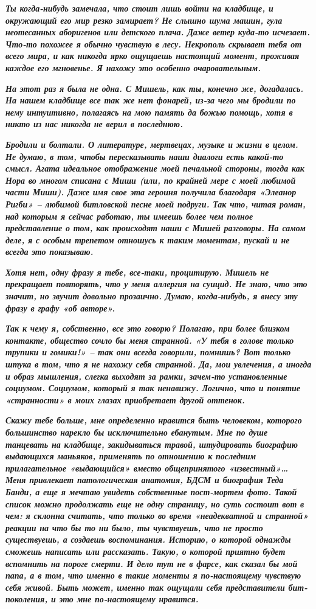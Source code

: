 \documentclass[
]{book}
\begin{document}
\textbf{\emph{
Ты когда-нибудь замечала, что стоит лишь войти на кладбище, и окружающий его мир резко замирает? Не слышно шума машин, гула неотесанных аборигенов или детского плача. Даже ветер куда-то исчезает. Что-то похожее я обычно чувствую в лесу. Некрополь скрывает тебя от всего мира, и как никогда ярко ощущаешь настоящий момент, проживая каждое его мгновенье. Я нахожу это особенно очаровательным.
}}

\textbf{\emph{
На этот раз я была не одна. С Мишель, как ты, конечно же, догадалась. На нашем кладбище все так же нет фонарей, из-за чего мы бродили по нему интуитивно, полагаясь на мою память да божью помощь, хотя в никто из нас никогда не верил в последнюю.
}}

\textbf{\emph{
Бродили и болтали. О литературе, мертвецах, музыке и жизни в целом. Не думаю, в том, чтобы пересказывать наши диалоги есть какой-то смысл. Агата идеальное отображение моей печальной стороны, тогда как Нора во многом списана с Миши (или, по крайней мере с моей любимой части Миши). Даже имя свое эта героиня получила благодаря «Элеанор Ригби» -- любимой битловской песне моей подруги. Так что, читая роман, над которым я сейчас работаю, ты имеешь более чем полное представление о том, как происходят наши с Мишей разговоры. На самом деле, я с особым трепетом отношусь к таким моментам, пускай и не всегда это показываю.
}}

\textbf{\emph{
Хотя нет, одну фразу я тебе, все-таки, процитирую. Мишель не прекращает повторять, что у меня аллергия на суицид. Не знаю, что это значит, но звучит довольно прозаично. Думаю, когда-нибудь, я внесу эту фразу в графу «об авторе».
}}

\textbf{\emph{
Так к чему я, собственно, все это говорю? Полагаю, при более близком контакте, общество сочло бы меня странной. «У тебя в голове только трупики и гомики!» -- так они всегда говорили, помнишь? Вот только штука в том, что я не нахожу себя странной. Да, мои увлечения, а иногда и образ мышления, слегка выходят за рамки, зачем-то установленные социумом. Социумом, который я так ненавижу. Логично, что и понятие «странности» в моих глазах приобретает другой оттенок.
}}

\textbf{\emph{
Скажу тебе больше, мне определенно нравится быть человеком, которого большинство нарекло бы исключительно ебанутым. Мне по душе танцевать на кладбище, закидываться травой, штудировать биографию выдающихся маньяков, применять по отношению к последним прилагательное «выдающийся» вместо общепринятого «известный»\ldots{} Меня привлекает патологическая анатомия, БДСМ и биография Теда Банди, а еще я мечтаю увидеть собственные пост-мортем фото. Такой список можно продолжать еще не одну страницу, но суть состоит вот в чем: я склонна считать, что только во время «неадекватной и странной» реакции на что бы то ни было, ты чувствуешь, что не просто существуешь, а создаешь воспоминания. Историю, о которой однажды сможешь написать или рассказать. Такую, о которой приятно будет вспомнить на пороге смерти. И дело тут не в фарсе, как сказал бы мой папа, а в том, что именно в такие моменты я по-настоящему чувствую себя живой. Быть может, именно так ощущали себя представители бит-поколения, и это мне по-настоящему нравится.
}}
\end{document}
